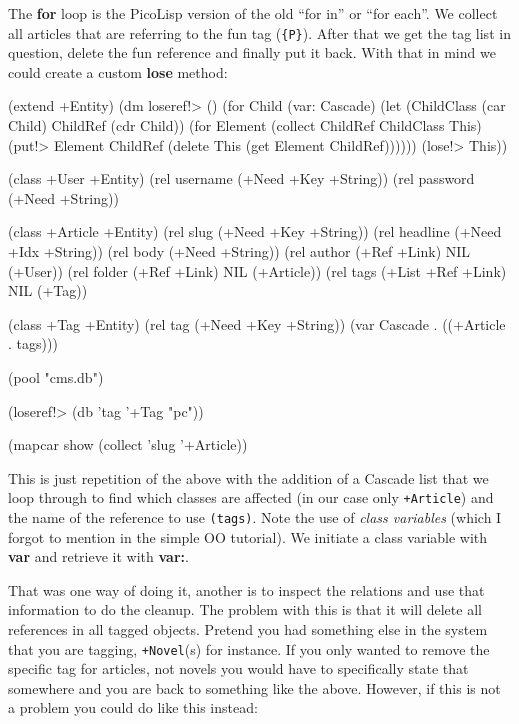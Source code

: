 The \textbf{for} loop is the PicoLisp version of the old ``for in'' or
``for each''. We collect all articles that are referring to the fun
tag (\texttt{\{P\}}). After that we get the tag list in question, delete the
fun reference and finally put it back. With that in mind we could
create a custom \textbf{lose} method:

\begin{wideverbatim}
(extend +Entity)
(dm loseref!> ()
    (for Child (var: Cascade) 
         (let (ChildClass (car Child) ChildRef (cdr Child)) 
           (for Element (collect ChildRef ChildClass This)
                (put!> Element ChildRef (delete This (get Element ChildRef))))))
    (lose!> This))

(class +User +Entity)
(rel username (+Need +Key +String))
(rel password (+Need +String))

(class +Article +Entity)
(rel slug     (+Need +Key +String))
(rel headline (+Need +Idx +String))
(rel body     (+Need +String))
(rel author   (+Ref +Link) NIL (+User))
(rel folder   (+Ref +Link) NIL (+Article))
(rel tags     (+List +Ref +Link) NIL (+Tag))

\end{wideverbatim}

\begin{wideverbatim}

(class +Tag +Entity)
(rel tag (+Need +Key +String))
(var Cascade . ((+Article . tags)))

(pool "cms.db")

(loseref!> (db 'tag '+Tag "pc"))

(mapcar show (collect 'slug '+Article))
\end{wideverbatim}

This is just repetition of the above with the addition of a Cascade
list that we loop through to find which classes are affected (in our
case only \texttt{+Article}) and the name of the reference to use
\texttt{(tags)}. Note the use of \emph{class variables} (which I
forgot to mention in the simple OO tutorial). We initiate a class
variable with \textbf{var} and retrieve it with \textbf{var:}.

That was one way of doing it, another is to inspect the relations and
use that information to do the cleanup. The problem with this is that it
will delete all references in all tagged objects. Pretend you had
something else in the system that you are tagging, \texttt{+Novel}(s) for
instance. If you only wanted to remove the specific tag for articles,
not novels you would have to specifically state that somewhere and you
are back to something like the above. However, if this is not a problem
you could do like this instead:

